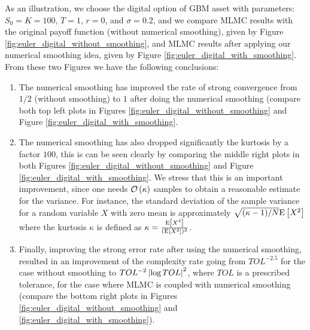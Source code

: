 As an illustration, we choose the digital option of GBM asset with parameters: $S_0=K=100$, $T=1$, $r= 0$, and   $\sigma=0.2$, and we compare MLMC results with the original payoff function (without numerical smoothing), given by Figure \ref{fig:euler_digital_without_smoothing},  and MLMC results after applying our numerical smoothing idea, given by Figure \ref{fig:euler_digital_with_smoothing}. From these two Figures we have the following conclusions:
\begin{enumerate}
\item The numerical smoothing has improved the rate of strong convergence from $1/2$ (without smoothing) to $1$ after doing the numerical smoothing (compare both top left plots in Figures \ref{fig:euler_digital_without_smoothing} and Figure \ref{fig:euler_digital_with_smoothing}.
\item The numerical smoothing has also dropped significantly the kurtosis by a factor $100$, this is can be seen clearly by comparing the middle right plots in both Figures \ref{fig:euler_digital_without_smoothing} and Figure \ref{fig:euler_digital_with_smoothing}. We stress that this is an important improvement, since one needs ${\mathcal{O}}\left(\kappa\right)$ samples  to obtain a reasonable estimate for the variance. For instance,  the standard deviation of the sample variance for a random variable $X$ with zero mean is approximately $\sqrt{(\kappa-1)/N} \mathrm{E}\left[X^2\right]$ where the kurtosis $\kappa$ is defined as $\kappa = \frac{\mathrm{E}\left[X^4\right]}{(\mathrm{E}\left[X^2\right])^2}$.  
\item Finally, improving the strong error rate after using the numerical smoothing, resulted in an improvement of the complexity rate going from $TOL^{-2.5}$ for the case without smoothing to  $TOL^{-2} \left\lvert\log TOL\right\rvert^2$, where $TOL$ is a prescribed tolerance, for the case where MLMC is coupled with numerical smoothing (compare the bottom right plots in Figures \ref{fig:euler_digital_without_smoothing} and \ref{fig:euler_digital_with_smoothing}).
\end{enumerate}


